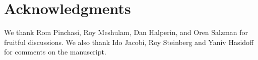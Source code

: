 \section*{Acknowledgments}
We thank Rom Pinchasi, Roy Meshulam, Dan Halperin, and Oren Salzman for fruitful discussions. We also thank Ido Jacobi, Roy Steinberg and Yaniv Hasidoff for comments on the manuscript. 
